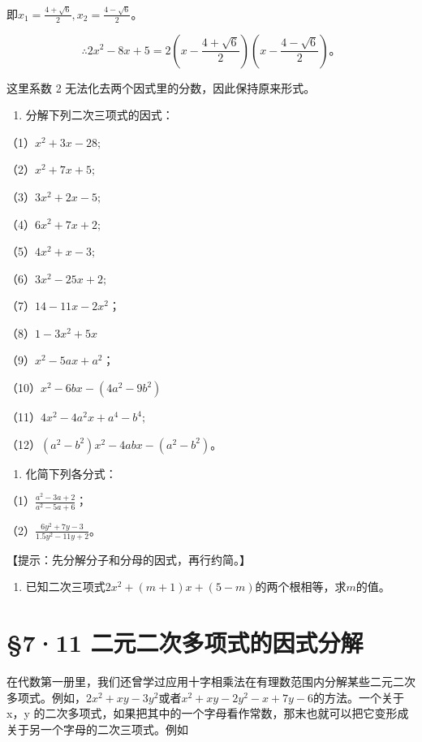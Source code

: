即\(x_{1} = \frac{4 + \sqrt{6}}{2}, x_{2} = \frac{4 - \sqrt{6}}{2}\)。

\[
\therefore 2 x ^ {2} - 8 x + 5 = 2 \left(x - \frac{4 + \sqrt {6}}{2}\right) \left(x - \frac{4 - \sqrt {6}}{2}\right)\text{。}
\]

 这里系数 2
无法化去两个因式里的分数，因此保持原来形式。

\begin{enumerate}
\item
  分解下列二次三项式的因式：
\end{enumerate}

（1）\(x^{2} + 3x - 28;\)

（2）\(x^{2} + 7x + 5;\)

（3）\(3x^{2} + 2x - 5;\)

（4）\(6x^{2} + 7x + 2;\)

（5）\(4x^{2} + x - 3;\)

（6）\(3x^{2} - 25x + 2;\)

（7）\(14 - 11x - 2x^{2}\)；

（8）\(1 - 3x^{2} + 5x\)

（9）\(x^{2} - 5ax + a^{2}\)；

（10）\(x^{2} - 6bx - (4a^{2} - 9b^{2})\)

（11）\(4x^{2} - 4a^{2}x + a^{4} - b^{4};\)

（12）\((a^2 - b^2)x^2 - 4abx - (a^2 - b^2)\)。

\begin{enumerate}[start=2]
\item
  化简下列各分式：
\end{enumerate}

（1）\(\frac{a^2 - 3a + 2}{a^2 - 5a + 6}\)；

（2）\(\frac{6y^2 + 7y - 3}{1.5y^2 - 11y + 2}\)。

【提示：先分解分子和分母的因式，再行约简。】

\begin{enumerate}[start=3]
\item
  已知二次三项式\(2x^{2} + (m + 1)x + (5 - m)\)的两个根相等，求\(m\)的值。
\end{enumerate}

\section{§7·11 二元二次多项式的因式分解}

在代数第一册里，我们还曾学过应用十字相乘法在有理数范围内分解某些二元二次多项式。例如，\(2x^{2}+xy-3y^{2}\)或者\(x^{2}+xy-2y^{2}-x+7y-6\)的方法。一个关于
x，y
的二次多项式，如果把其中的一个字母看作常数，那末也就可以把它变形成关于另一个字母的二次三项式。例如

